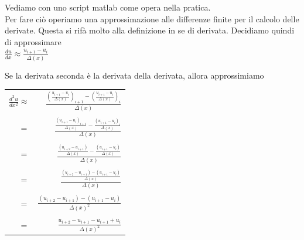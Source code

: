 Vediamo con uno script matlab come opera nella pratica. \\
Per fare ciò operiamo una approssimazione alle differenze finite per il calcolo delle derivate. Questa si rifà molto alla definizione in se di derivata. Decidiamo quindi di approssimare \\
\vspace{2pt}
\centering 
$\frac{du}{dx} \approx \frac{u_{i+1} - u_i}{\Delta(x)} $\\
\vspace{2pt}
\raggedright
Se la derivata seconda è la derivata della derivata, allora approssimiamo \\
\vspace{3cm}
\begin{interlinea}{6}
\begin{table}[htp]              
\centering                      
\begin{tabular}%
{r r}                  %

$\frac{d^2u}{dx^2} \approx$ &
$\frac{
(\frac{u_{i+1} - u_i}{\Delta(x)})_{i+1} 
- 
(\frac{u_{i+1} - u_i}{\Delta(x)})_i
}{\Delta(x)}$

\\

\vline

\\
$=$ &
$\frac{
\frac{(u_{i+1} - u_i)_{i+1}}{\Delta(x)} 
-   
\frac{(u_{i+1} - u_i)_i}{\Delta(x)}
}{\Delta(x)}$

\\

\vline 

\\
$=$ &
$\frac{
\frac{(u_{i+2} - u_{i+1})}{\Delta(x)} 
- 
\frac{(u_{i+1} - u_i)}{\Delta(x)}
}{\Delta(x)}$

\\

\vline 

\\
$=$ &
$\frac{
\frac{(u_{i+2} - u_{i+1}) 
- 
(u_{i+1} - u_i)}{\Delta(x)}
}{\Delta(x)}$

\\

\vline

\\
$=$ &
$\frac{
(u_{i+2} - u_{i+1}) 
- 
(u_{i+1} - u_i)}
{\Delta(x)^2}$

\\

\vline

\\
$=$ &
$\frac{
 u_{i+2} - u_{i+1} 
-u_{i+1} + {u_i}}
{\Delta(x)^2}$
\\

\end{tabular}
\end{table}
\end{interlinea}


